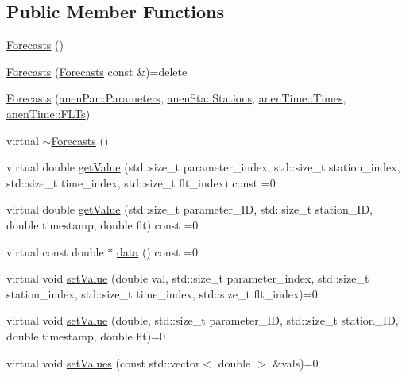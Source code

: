 \subsection*{Public Member Functions}
\begin{DoxyCompactItemize}
\item 
\mbox{\hyperlink{class_forecasts_a2614be37bc63171f7d2b9d8b9f9d8871}{Forecasts}} ()
\item 
\mbox{\hyperlink{class_forecasts_a6f47e34b9ae9bb9496149208e3246d65}{Forecasts}} (\mbox{\hyperlink{class_forecasts}{Forecasts}} const \&)=delete
\item 
\mbox{\hyperlink{class_forecasts_a9170f0dd3065f443e19b4280dc2bee2d}{Forecasts}} (\mbox{\hyperlink{classanen_par_1_1_parameters}{anen\+Par\+::\+Parameters}}, \mbox{\hyperlink{classanen_sta_1_1_stations}{anen\+Sta\+::\+Stations}}, \mbox{\hyperlink{classanen_time_1_1_times}{anen\+Time\+::\+Times}}, \mbox{\hyperlink{classanen_time_1_1_f_l_ts}{anen\+Time\+::\+F\+L\+Ts}})
\item 
virtual \mbox{\hyperlink{class_forecasts_a340fd19812d62efc334fe4d23ff8dcd2}{$\sim$\+Forecasts}} ()
\item 
virtual double \mbox{\hyperlink{class_forecasts_a7e6690ba3d8af6ca02d76c6c57701ed4}{get\+Value}} (std\+::size\+\_\+t parameter\+\_\+index, std\+::size\+\_\+t station\+\_\+index, std\+::size\+\_\+t time\+\_\+index, std\+::size\+\_\+t flt\+\_\+index) const =0
\item 
virtual double \mbox{\hyperlink{class_forecasts_a07a51e97b54a5c42d197fb4804ee43bc}{get\+Value}} (std\+::size\+\_\+t parameter\+\_\+\+ID, std\+::size\+\_\+t station\+\_\+\+ID, double timestamp, double flt) const =0
\item 
virtual const double $\ast$ \mbox{\hyperlink{class_forecasts_abd9768fd95e64920efa89c2c9115cb4d}{data}} () const =0
\item 
virtual void \mbox{\hyperlink{class_forecasts_a4ce21957ef296384b1e251098db953bc}{set\+Value}} (double val, std\+::size\+\_\+t parameter\+\_\+index, std\+::size\+\_\+t station\+\_\+index, std\+::size\+\_\+t time\+\_\+index, std\+::size\+\_\+t flt\+\_\+index)=0
\item 
virtual void \mbox{\hyperlink{class_forecasts_a584820dc47f1b5c4cae099485ee59cbe}{set\+Value}} (double, std\+::size\+\_\+t parameter\+\_\+\+ID, std\+::size\+\_\+t station\+\_\+\+ID, double timestamp, double flt)=0
\item 
virtual void \mbox{\hyperlink{class_forecasts_ae2a59385e03dd372fef3dfe89f5a31cf}{set\+Values}} (const std\+::vector$<$ double $>$ \&vals)=0

\end{DoxyCompactItemize}
